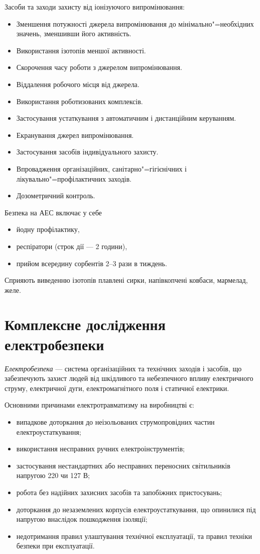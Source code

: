 \documentclass[a5paper,10pt,notitlepage,pdftex,headsepline]{scrartcl}
\begin{document}
  Засоби та заходи захисту від іонізуючого випромінювання:
  \begin{itemize}
    \item Зменшення потужності джерела випромінювання до
      мінімально"=необхідних значень, зменшивши його активність.
    \item Використання ізотопів меншої активності.
    \item Скорочення часу роботи з джерелом випромінювання.
    \item Віддалення робочого місця від джерела.
    \item Використання роботизованих комплексів.
    \item Застосування устаткування з автоматичним і дистанційним керуванням.
    \item Екранування джерел випромінювання.
    \item Застосування засобів індивідуального захисту.
    \item Впровадження організаційних, санітарно"=гігієнічних і
      лікувально"=профілактичних заходів.
    \item Дозометричний контроль.
  \end{itemize}

  Безпека на АЕС включає у себе
  \begin{itemize}
    \item йодну профілактику,
    \item респіратори (строк дії --- 2 години),
    \item прийом всередину сорбентів 2--3 рази в тиждень.
  \end{itemize}

  Сприяють виведенню ізотопів плавлені сирки, напівкопчені ковбаси, мармелад,
  желе.
\section{Комплексне дослідження електробезпеки}
  \emph{Електробезпека} --- система організаційних та технічних заходів і
  засобів, що забезпечують захист людей від шкідливого та небезпечного впливу
  електричного струму, електричної дуги, електромагнітного поля і статичної
  електрики.

  Основними причинами електротравматизму на виробництві є:
  \begin{itemize}
    \item випадкове доторкання до неізольованих струмопровідних частин
      електроустаткування;
    \item використання несправних ручних електроінструментів;
    \item застосування нестандартних або несправних переносних світильників
      напругою 220 чи 127 В;
    \item робота без надійних захисних засобів та запобіжних пристосувань;
    \item доторкання до незаземлених корпусів електроустаткування, що
      опинилися під напругою внаслідок пошкодження ізоляції;
    \item недотримання правил улаштування технічної експлуатації, та правил
    техніки безпеки при експлуатації.
  \end{itemize}
\end{document}
